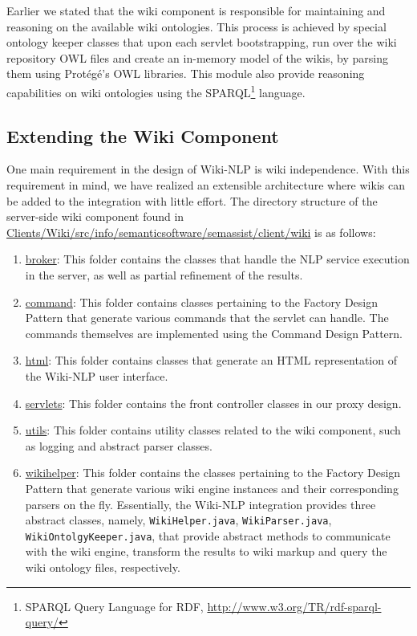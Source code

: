 \blankline
Earlier we stated that the wiki component is responsible for maintaining and reasoning on the available wiki ontologies. This process is achieved by special ontology keeper classes that upon each servlet bootstrapping, run over the wiki repository OWL files and create an in-memory model of the wikis, by parsing them using Prot\'{e}g\'{e}'s OWL libraries. This module also provide reasoning capabilities on wiki ontologies using the SPARQL\footnote{SPARQL Query Language for RDF, \url{http://www.w3.org/TR/rdf-sparql-query/}} language.

\subsection{Extending the Wiki Component}
One main requirement in the design of Wiki-NLP is wiki independence. With this requirement in mind, we have realized an extensible architecture where wikis can be added to the integration with little effort. The directory structure of the server-side wiki component found in \url{Clients/Wiki/src/info/semanticsoftware/semassist/client/wiki} is as follows:

\begin{enumerate}
\item\url{broker}: This folder contains the classes that handle the NLP service execution in the \sa server, as well as partial refinement of the results.
\item\url{command}: This folder contains classes pertaining to the Factory Design Pattern that generate various commands that the servlet can handle. The commands themselves are implemented using the Command Design Pattern. 
\item\url{html}: This folder contains classes that generate an HTML representation of the Wiki-NLP user interface.
\item\url{servlets}: This folder contains the front controller classes in our proxy design.
\item\url{utils}: This folder contains utility classes related to the wiki component, such as logging and abstract parser classes.
\item\url{wikihelper}: This folder contains the classes pertaining to the Factory Design Pattern that generate various wiki engine instances and their corresponding parsers on the fly. Essentially, the Wiki-NLP integration provides three abstract classes, namely, \texttt{WikiHelper.java}, \texttt{WikiParser.java}, \texttt{WikiOntolgyKeeper.java}, that provide abstract methods to communicate with the wiki engine, transform the results to wiki markup and query the wiki ontology files, respectively. 
\end{enumerate}

